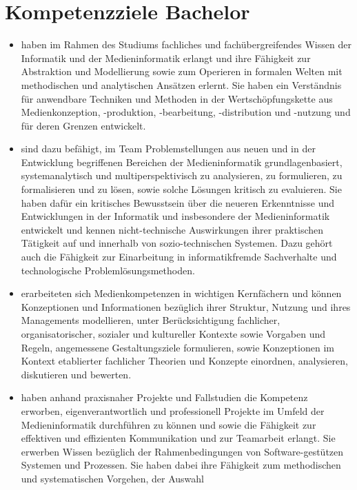 \section{Kompetenzziele Bachelor}\label{kompetenzziele-bachelor}

\begin{itemize}
\item
  haben im Rahmen des Studiums fachliches und fachübergreifendes Wissen
  der Informatik und der Medieninformatik erlangt und ihre Fähigkeit zur
  Abstraktion und Modellierung sowie zum Operieren in formalen Welten
  mit methodischen und analytischen Ansätzen erlernt. Sie haben ein
  Verständnis für anwendbare Techniken und Methoden in der
  Wertschöpfungskette aus Medienkonzeption, -produktion, -bearbeitung,
  -distribution und -nutzung und für deren Grenzen entwickelt.
\item
  sind dazu befähigt, im Team Problemstellungen aus neuen und in der
  Entwicklung begriffenen Bereichen der Medieninformatik
  grundlagenbasiert, systemanalytisch und multiperspektivisch zu
  analysieren, zu formulieren, zu formalisieren und zu lösen, sowie
  solche Lösungen kritisch zu evaluieren. Sie haben dafür ein kritisches
  Bewusstsein über die neueren Erkenntnisse und Entwicklungen in der
  Informatik und insbesondere der Medieninformatik entwickelt und kennen
  nicht-technische Auswirkungen ihrer praktischen Tätigkeit auf und
  innerhalb von sozio-technischen Systemen. Dazu gehört auch die
  Fähigkeit zur Einarbeitung in informatikfremde Sachverhalte und
  technologische Problemlösungsmethoden.
\item
  erarbeiteten sich Medienkompetenzen in wichtigen Kernfächern und
  können Konzeptionen und Informationen bezüglich ihrer Struktur,
  Nutzung und ihres Managements modellieren, unter Berücksichtigung
  fachlicher, organisatorischer, sozialer und kultureller Kontexte sowie
  Vorgaben und Regeln, angemessene Gestaltungsziele formulieren, sowie
  Konzeptionen im Kontext etablierter fachlicher Theorien und Konzepte
  einordnen, analysieren, diskutieren und bewerten.
\item
  haben anhand praxisnaher Projekte und Fallstudien die Kompetenz
  erworben, eigenverantwortlich und professionell Projekte im Umfeld der
  Medieninformatik durchführen zu können und sowie die Fähigkeit zur
  effektiven und effizienten Kommunikation und zur Teamarbeit erlangt.
  Sie erwerben Wissen bezüglich der Rahmenbedingungen von
  Software-gestützen Systemen und Prozessen. Sie haben dabei ihre
  Fähigkeit zum methodischen und systematischen Vorgehen, der Auswahl

\end{itemize}
